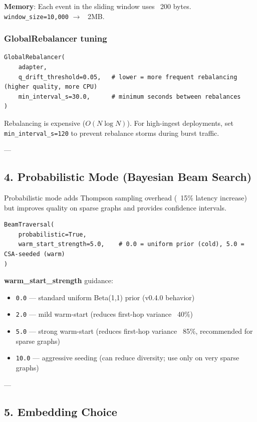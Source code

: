 \documentclass[11pt,article,oneside]{memoir}
\begin{document}
\textbf{Memory}: Each event in the sliding window uses ~200 bytes. \texttt{window\_size=10,000} $\to$ ~2MB.

\subsubsection{GlobalRebalancer tuning}
\begin{lstlisting}
GlobalRebalancer(
    adapter,
    q_drift_threshold=0.05,   # lower = more frequent rebalancing (higher quality, more CPU)
    min_interval_s=30.0,      # minimum seconds between rebalances
)
\end{lstlisting}

Rebalancing is expensive ($O(N \log N)$). For high-ingest deployments, set \texttt{min\_interval\_s=120} to prevent rebalance storms during burst traffic.

---

\subsection{4. Probab\-ilistic Mode (Bayesian Beam Search)}

Probab\-ilistic mode adds Thompson sampling overhead (~15\% latency increase) but improves quality on sparse graphs and provides confidence intervals.

\begin{lstlisting}
BeamTraversal(
    probabilistic=True,
    warm_start_strength=5.0,    # 0.0 = uniform prior (cold), 5.0 = CSA-seeded (warm)
)
\end{lstlisting}

\textbf{warm\_start\_strength} guidance:
\begin{itemize}
\item \texttt{0.0} — standard uniform Beta(1,1) prior (v0.4.0 behavior)
\item \texttt{2.0} — mild warm-start (reduces first-hop variance ~40\%)
\item \texttt{5.0} — strong warm-start (reduces first-hop variance ~85\%, recommended for sparse graphs)
\item \texttt{10.0} — aggressive seeding (can reduce diversity; use only on very sparse graphs)

\end{itemize}
---

\subsection{5. Embedding Choice}
\end{document}
